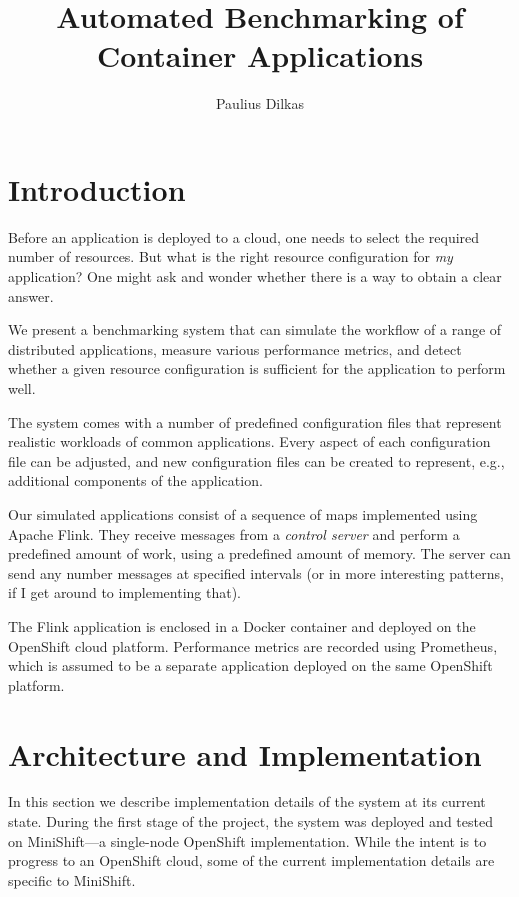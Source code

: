 \documentclass{article}
\title{Automated Benchmarking of Container Applications}
\author{Paulius Dilkas}
\begin{document}
\maketitle


\section{Introduction}

Before an application is deployed to a cloud, one needs to select the required
number of resources. But what is the right resource configuration for \emph{my}
application? One might ask and wonder whether there is a way to obtain a clear
answer.

We present a benchmarking system that can simulate the workflow of a range of
distributed applications, measure various performance metrics, and detect
whether a given resource configuration is sufficient for the application to
perform well.

The system comes with a number of predefined configuration files that represent
realistic workloads of common applications. Every aspect of each configuration
file can be adjusted, and new configuration files can be created to represent,
e.g., additional components of the application.

Our simulated applications consist of a sequence of maps implemented using
Apache Flink. They receive messages from a \emph{control server} and perform a
predefined amount of work, using a predefined amount of memory. The server can
send any number messages at specified intervals (or in more interesting
patterns, if I get around to implementing that).

The Flink application is enclosed in a Docker container and deployed on the
OpenShift cloud platform. Performance metrics are recorded using Prometheus,
which is assumed to be a separate application deployed on the same OpenShift
platform.

\section{Architecture and Implementation}

In this section we describe implementation details of the system at its current
state. During the first stage of the project, the system was deployed and tested
on MiniShift---a single-node OpenShift implementation. While the intent is to
progress to an OpenShift cloud, some of the current implementation details are
specific to MiniShift.
\end{document}
